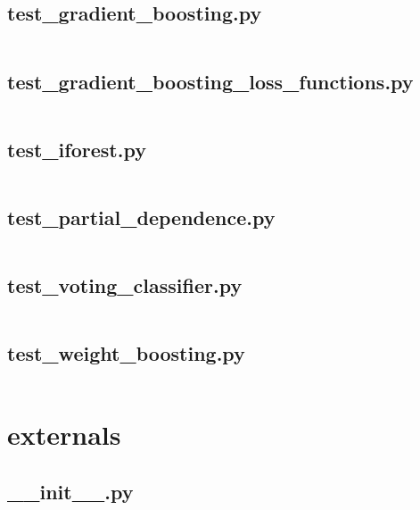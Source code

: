 \documentclass{article}
\begin{document}
\subsection{test\_gradient\_boosting.py}
\inputminted{python}{/home/dufferzafar/dev/@clones/scikit-learn/sklearn/ensemble/tests/test_gradient_boosting.py}
\newpage

\subsection{test\_gradient\_boosting\_loss\_functions.py}
\inputminted{python}{/home/dufferzafar/dev/@clones/scikit-learn/sklearn/ensemble/tests/test_gradient_boosting_loss_functions.py}
\newpage

\subsection{test\_iforest.py}
\inputminted{python}{/home/dufferzafar/dev/@clones/scikit-learn/sklearn/ensemble/tests/test_iforest.py}
\newpage

\subsection{test\_partial\_dependence.py}
\inputminted{python}{/home/dufferzafar/dev/@clones/scikit-learn/sklearn/ensemble/tests/test_partial_dependence.py}
\newpage

\subsection{test\_voting\_classifier.py}
\inputminted{python}{/home/dufferzafar/dev/@clones/scikit-learn/sklearn/ensemble/tests/test_voting_classifier.py}
\newpage

\subsection{test\_weight\_boosting.py}
\inputminted{python}{/home/dufferzafar/dev/@clones/scikit-learn/sklearn/ensemble/tests/test_weight_boosting.py}
\newpage

\section{externals}

\subsection{\_\_init\_\_.py}
\inputminted{python}{/home/dufferzafar/dev/@clones/scikit-learn/sklearn/externals/__init__.py}
\newpage
\end{document}

